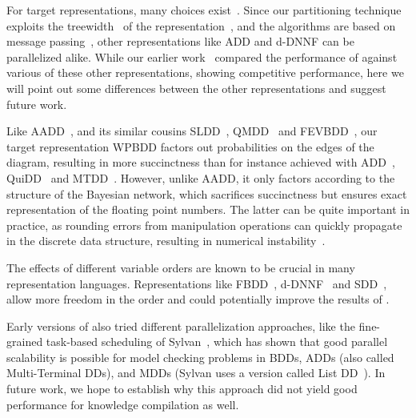 For target representations, many choices exist~\cite{chavira2008probabilistic,darwiche2011sdd,choi2022fpga}. Since our partitioning technique exploits the treewidth~\cite{chen2022definition} of the representation~\cite[\S 5]{dal2021compositional}, and the algorithms are based on message passing~\cite[\S 4]{dal2021compositional}, other representations like ADD and d-DNNF can be parallelized alike. While our earlier work~\cite{dal2018parallel} compared the performance of \toolname against various of these other representations, showing competitive performance, here we will point out some differences between the other representations and suggest future work.


Like AADD~\cite{sanner2005affine}, and its similar cousins SLDD~\cite{wilson2005decision}, QMDD~\cite{miller2006qmdd} and FEVBDD~\cite{tafertshofer1997factored}, our target representation WPBDD factors out probabilities on the edges of the diagram, resulting in more succinctness than for instance achieved with ADD~\cite{bahar}, QuiDD~\cite{viamontes2003improving} and MTDD~\cite{Clarke2001}. However, unlike AADD, it only factors according to the structure of the Bayesian network, which sacrifices succinctness but ensures exact representation of the floating point numbers. The latter can be quite important in practice, as rounding errors from manipulation operations can quickly propagate in the discrete data structure, resulting in numerical instability~\cite{hillmich2022reordering}.

The effects of different variable orders are known to be crucial in many representation languages. Representations like FBDD~\cite{wegener2000branching}, d-DNNF~\cite{chavira2008probabilistic} and SDD~\cite{darwiche2011sdd}, allow more freedom in the order and could potentially improve the results of \toolname.

Early versions of \toolname also tried different parallelization approaches, like the fine-grained task-based scheduling of Sylvan~\cite{van2013multi}, which has shown that good parallel scalability is possible for model checking problems in BDDs, ADDs (also called Multi-Terminal DDs), and MDDs (Sylvan uses a version called List DD~\cite{sylvan-journal}). In future work, we hope to establish why this approach did not yield good performance for knowledge compilation as well.




